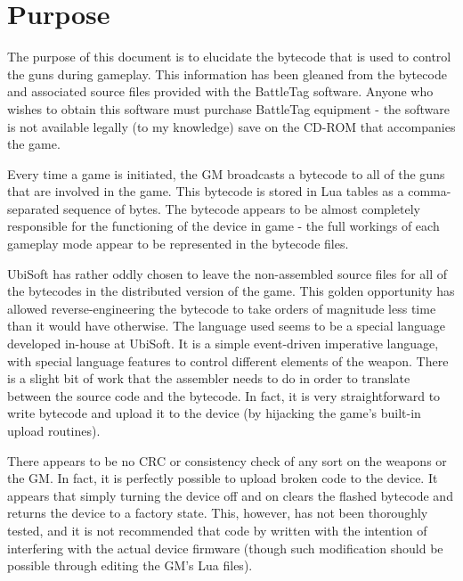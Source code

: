 \documentclass[12pt,a4paper]{scrbook}
\begin{document}
\section*{Purpose}

The purpose of this document is to elucidate the bytecode that is used to control the 
guns during gameplay.  This information has been gleaned from the bytecode and associated
source files provided with the BattleTag software.  Anyone who wishes to obtain this 
software must purchase BattleTag equipment - the software is not available legally (to
my knowledge) save on the CD-ROM that accompanies the game.

Every time a game is initiated, the GM broadcasts a bytecode
to all of the guns that are involved in the game.  This bytecode is stored in Lua tables
as a comma-separated sequence of bytes.  The bytecode appears to be almost completely
responsible for the functioning of the device in game - the full workings of each gameplay
mode appear to be represented in the bytecode files.

UbiSoft has rather oddly chosen to leave the non-assembled source files for all of the
bytecodes in the distributed version of the game.  This golden opportunity has allowed
reverse-engineering the bytecode to take orders of magnitude less time than it would
have otherwise.  The language used seems to be a special language developed in-house at
UbiSoft.  It is a simple event-driven imperative language, with special language features to control
different elements of the weapon.  There is a slight bit of work that the assembler needs 
to do in order to translate between the source code and the bytecode.  In fact, it is very
straightforward to write bytecode and upload it to the device (by hijacking the game's built-in
upload routines).  

There appears to be no CRC or consistency check of any sort on the weapons or the GM.  In fact,
it is perfectly possible to upload broken code to the device.  It appears that simply turning
the device off and on clears the flashed bytecode and returns the device to a factory state.
This, however, has not been thoroughly tested, and it is not recommended that code by written
with the intention of interfering with the actual device firmware (though such modification 
should be possible through editing the GM's Lua files).

\end{document}

